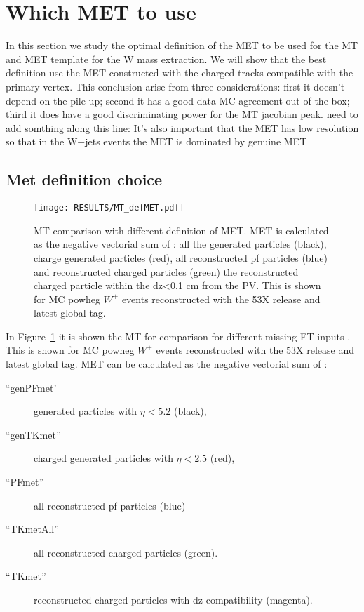 \newpage 

\section{Which MET to use}
\label{sec:METDEF}
In this section we study the optimal definition of the MET to be used for the MT and MET template for the W mass extraction.
We will show that the best definition use the MET constructed with the charged tracks compatible with the primary vertex.
This conclusion arise from three considerations: first it doesn't depend on the pile-up; second it has a good data-MC agreement out of the box; third it does have a good discriminating power for the MT jacobian peak.
{\color{magenta} {need to add somthing along this line: It's also important that the MET has low resolution so that in the W+jets events the MET is dominated by genuine MET}}

\subsection{Met definition choice}
\begin{figure}[h!]
  \begin{center}
    \texttt{[image: RESULTS/MT\_defMET.pdf]}
    \caption{MT comparison with different definition of MET. MET is calculated as the negative vectorial sum of : all the generated particles (black), charge generated  particles (red), all reconstructed pf particles (blue) and reconstructed charged particles (green) the reconstructed charged particle within the dz<0.1 cm from the PV. This is shown for MC powheg $W^{+}$ events reconstructed with the 53X release and latest global tag.}
    \label{fig:PFMETvsTKMET}
  \end{center}
\end{figure}

In Figure~\ref{fig:PFMETvsTKMET} it is shown the MT for comparison for different missing ET inputs .
This is shown for MC powheg $W^{+}$ events reconstructed with the 53X release and latest global tag.
MET can be calculated as the negative vectorial sum of : 
\begin{description} 
\item[``genPFmet']  generated particles with $\eta<5.2$ (black), 
\item[``genTKmet''] charged generated  particles with $\eta<2.5$ (red), 
\item[``PFmet''] all reconstructed pf particles   (blue) 
\item[``TKmetAll''] all reconstructed charged particles (green).
\item[``TKmet''] reconstructed charged particles with dz compatibility (magenta).
\end{description}

